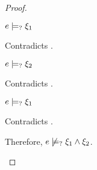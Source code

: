 \begin{proof}
\begin{byCases}
\begin{byCases}
\begin{byCases}
        \item[\text{(\ref{rule:CMSAnd1})}]
            \begin{pfsteps*}
            \item $e \models_{?} \xi_1$ 
            \end{pfsteps*}
            Contradicts .
        \item[\text{(\ref{rule:CMSAnd2})}]
            \begin{pfsteps*}
            \item $e \models_{?} \xi_2$ 
            \end{pfsteps*}
            Contradicts .
        \item[\text{(\ref{rule:CMSAnd3})}]
            \begin{pfsteps*}
            \item $e \models_{?} \xi_1$ 
            \end{pfsteps*}
            Contradicts .
        \end{byCases}
        Therefore, $e \not\models_{?} \xi_1 \wedge \xi_2$.
        

\end{byCases}
\end{byCases}
\end{proof}
